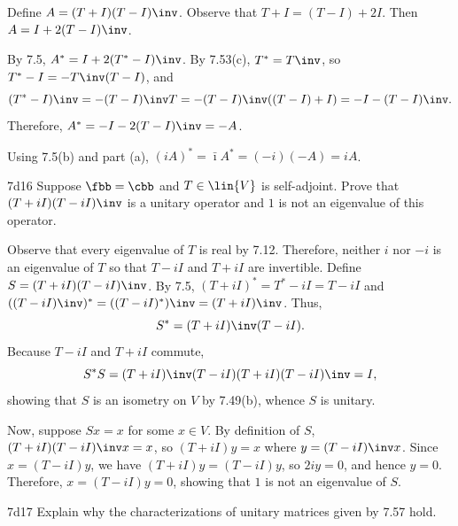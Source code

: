 \begin{sol}
    Define $A = (T + I)(T - I)\inv$.
    Observe that $T + I = (T - I) + 2I$.
    Then $A = I + 2(T - I)\inv$.
    \begin{subexercises}
        \item By 7.5, $A^\ast = I + 2(T^\ast - I)\inv$.
        By 7.53(c), $T^\ast = T\inv$, so $T^\ast - I = -T\inv(T - I)$, and
        \[
            (T^\ast - I)\inv = -(T - I)\inv T = -(T - I)\inv((T - I) + I) = -I - (T - I)\inv.
        \]
        Therefore, $A^\ast = -I - 2(T - I)\inv = -A$.
        \item Using 7.5(b) and part (a), $(iA)^\ast = \bar\imath A^\ast = (-i)(-A) = iA$. \qedhere
    \end{subexercises}
\end{sol}

\begin{exercise}{7d16}
    Suppose $\fbb = \cbb$ and $T \in \lin{V}$ is self-adjoint.
    Prove that $(T + iI)(T - iI)\inv$ is a unitary operator and $1$ is not an eigenvalue of this operator.
\end{exercise}

\begin{sol}
    Observe that every eigenvalue of $T$ is real by 7.12.
    Therefore, neither $i$ nor $-i$ is an eigenvalue of $T$ so that $T - iI$ and $T + iI$ are invertible.
    Define $S = (T + iI)(T - iI)\inv$.
    By 7.5, $(T + iI)^\ast = T^\ast - iI = T - iI$ and $((T - iI)\inv)^\ast = ((T - iI)^\ast)\inv = (T + iI)\inv$.
    Thus,
    \[
        S^\ast = (T + iI)\inv (T - iI).
    \]
    Because $T - iI$ and $T + iI$ commute,
    \[
        S^\ast S = (T + iI)\inv (T - iI) (T + iI)(T - iI)\inv = I,
    \]
    showing that $S$ is an isometry on $V$ by 7.49(b), whence $S$ is unitary.

    Now, suppose $S x = x$ for some $x \in V$.
    By definition of $S$, $(T + iI)(T - iI)\inv x = x$, so $(T + iI)y = x$ where $y = (T - iI)\inv x$.
    Since $x = (T - iI)y$, we have $(T + iI)y = (T - iI)y$, so $2i y = 0$, and hence $y = 0$.
    Therefore, $x = (T - iI)y = 0$, showing that $1$ is not an eigenvalue of $S$.
\end{sol}

\begin{exercise}{7d17}
    Explain why the characterizations of unitary matrices given by 7.57 hold.
\end{exercise}

